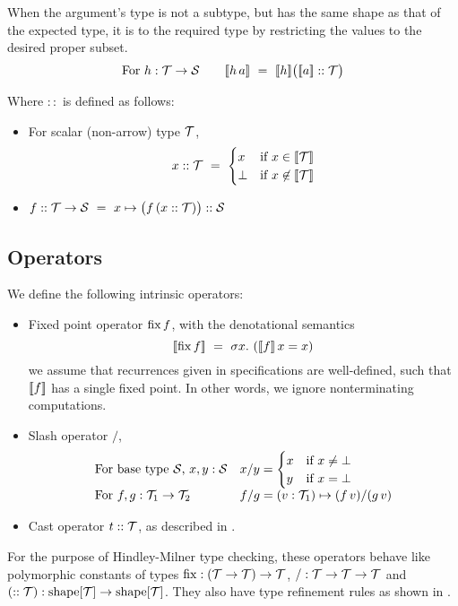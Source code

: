 When the argument's type is not a subtype, but has the same shape as that of the expected type,
it is  to the required type by restricting the values to the desired proper subset.
%
\[\mbox{For }h:\mathcal{T}\to\mathcal{S} \qquad [\![{h\,a}]\!] ~=~ [\![{h}]\!]\big([\![{a}]\!] :: \mathcal{T}\big)\]

Where $::$ is defined as follows:
\begin{itemize}
  \item For scalar (non-arrow) type $\mathcal{T}$, \[x :: \mathcal{T} ~=~ \begin{cases}x & \mbox{if }x\in[\![{\mathcal{T}}]\!] \\ \bot & \mbox{if }x\not\in[\![{\mathcal{T}}]\!]\end{cases}\]
  \item $f :: \mathcal{T}\to\mathcal{S} ~=~ x\mapsto \big(f\,(x :: \mathcal{T})\big) :: \mathcal{S}$
\end{itemize}

\subsection{Operators}

\newcommand\applt{\textrm{{\scriptsize\,}\guillemotright{\scriptsize\,}}}

We define the following intrinsic operators:

\begin{itemize}
  \item Fixed point operator $\operatorname{fix} f$, with the denotational semantics
    \[[\![{\operatorname{fix} f}]\!] ~=~ \sigma x.~ ([\![{f}]\!]\,x=x)\]
  we assume that recurrences given in specifications are well-defined, 
  such that $[\![{f}]\!]$ has a single fixed point.
  In other words, we ignore nonterminating computations.
  \item Slash operator $/$,
  \[\begin{array}{ll}
      \mbox{For base type $\mathcal{S}$, $x,y:\mathcal{S}$} & x/y = \begin{cases}x & \mbox{if }x\neq\bot \\ y & \mbox{if }x=\bot\end{cases} \\
      \mbox{For $f,g:\mathcal{T}_1\to\mathcal{T}_2$} & f/g = (v:\mathcal{T}_1)\mapsto (f\,v)/(g\,v)
    \end{array}\]
  \item Cast operator $t :: \mathcal{T}$, as described in .
\end{itemize}

For the purpose of Hindley-Milner type checking, these operators behave like polymorphic
constants of types ${\operatorname{fix}} : (\mathcal{T}\to\mathcal{T})\to\mathcal{T}$, ${/} : \mathcal{T}\to\mathcal{T}\to\mathcal{T}$ and $(::\mathcal{T}) : \mathrm{shape}[\mathcal{T}]\to\mathrm{shape}[\mathcal{T}]$.
They also have type refinement rules as shown in .

